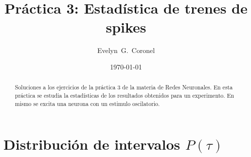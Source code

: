 
\usepackage{hyperref}


\title{Práctica 3: Estadística de trenes de spikes }
\author{Evelyn~G.~Coronel}


\date[]{\lowercase{\today}} %

\begin{abstract}
Soluciones a los ejercicios de la práctica 3 de la materia de Redes Neuronales. En esta práctica se estudia la estadísticas de los resultados obtenidos para un experimento. En mismo se excita una neurona con un estimulo oscilatorio.
\end{abstract} 
\maketitle

\section{Distribución de intervalos \texorpdfstring{$P(\tau)$}{}}




